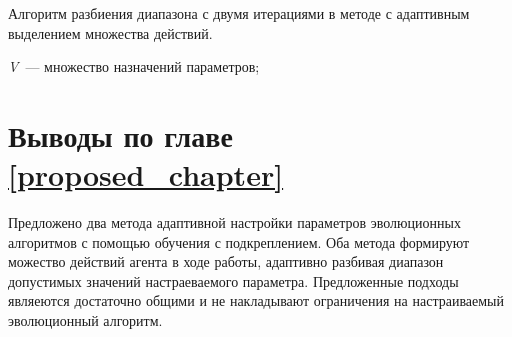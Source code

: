 \begin{algorithm}[h!]
    \caption{Алгоритм разбиения диапазона с двумя итерациями в методе с адаптивным выделением множества действий.}
    \label{dist_scheme}
    \begin{algorithmic}[1]
	\REQUIRE  
	  \textit{V}~--- множество назначений параметров;
	  \ELSE
	      \STATE {$P \gets \{[v_{min}, s], (s, v_{max}]\}$}
	      \STATE {$P \gets \{[v_{min}, s], (s, s_r], (s_r, v_{max}]\}$}
	      \STATE {$P \gets \{[v_{min}, s_l], (s_l, s], (s, v_{max}]\}$}
	     \ELSE
	      \STATE {$P \gets \{[v_{min}, s_l], (s_l, s], (s, s_r], (s_r, v_{max}]\}$}
	    \ENDIF
	  \ENDIF
        \ENDFOR
    \end{algorithmic}
\end{algorithm}

\section{Выводы по главе \protect\ref{proposed_chapter}}
Предложено два метода адаптивной настройки параметров эволюционных алгоритмов с помощью обучения с подкреплением. Оба метода формируют можество действий агента в ходе работы, адаптивно разбивая диапазон допустимых значений настраеваемого параметра. Предложенные подходы являеются достаточно общими и не накладывают ограничения на настраиваемый эволюционный алгоритм.